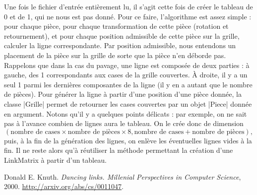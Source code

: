 \documentclass[11pt,french,a4paper]{article}
\begin{document}
Une fois le fichier d'entrée entièrement lu, il s'agit cette fois de créer le tableau de 0 et de 1, qui ne nous est pas donné. Pour ce faire, l'algorithme est assez simple : pour chaque pièce, pour chaque transformation de cette pièce (rotation et retournement), et pour chaque position admissible de cette pièce sur la grille, calculer la ligne correspondante. Par position admissible, nous entendons un placement de la pièce sur la grille de sorte que la pièce n'en déborde pas. Rappelons que dans la cas du pavage, une ligne est composée de deux parties : à gauche, des 1 correspondants aux cases de la grille couvertes. À droite, il y a un seul 1 parmi les dernières composantes de la ligne (il y en a autant que le nombre de pièces). Pour générer la ligne à partir d'une position d'une pièce donnée, la classe |Grille| permet de retourner les cases couvertes par un objet |Piece| donnée en argument. Notons qu'il y a quelques points délicats : par exemple, on ne sait pas à l'avance combien de lignes aura le tableau. On le crée donc de dimension 
\[(\text{nombre de cases}\times\text{nombre de pièces}\times8 , \text{nombre de cases} + \text{nombre de pièces}),\]
puis, à la fin de la génération des lignes, on enlève les éventuelles lignes vides à la fin. Il ne reste alors qu'à réutiliser la méthode permettant la création d'une LinkMatrix à partir d'un tableau. 

\begin{thebibliography}{9}
 Donald E. Knuth. \emph{Dancing links. Millenial Perspectives in Computer Science}, 2000.
\url{http://arxiv.org/abs/cs/0011047}.
\end{thebibliography}
\end{document}
